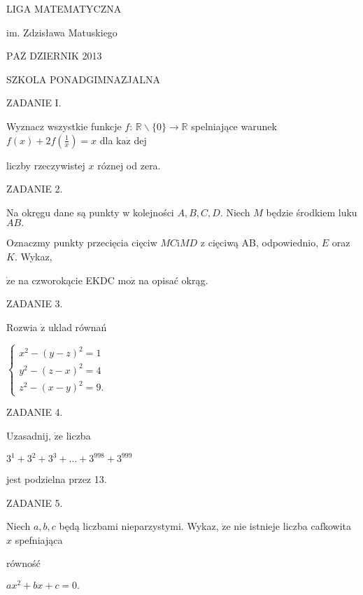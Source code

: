 \documentclass[a4paper,12pt]{article}
\begin{document}
LIGA MATEMATYCZNA

im. Zdzisława Matuskiego

$\mathrm{P}\mathrm{A}\overline{\mathrm{Z}}$ DZIERNIK 2013

SZKOLA PONADGIMNAZJALNA

ZADANIE I.

Wyznacz wszystkie funkcje $f$: $\mathbb{R}\backslash \{0\}\rightarrow \mathbb{R}$ spelniające warunek $f(x)+2f(\displaystyle \frac{1}{x})=x$ dla $\mathrm{k}\mathrm{a}\dot{\mathrm{z}}$ dej

liczby rzeczywistej $x$ róznej od zera.

ZADANIE 2.

Na okręgu dane są punkty w kolejności $A, B, C, D$. Niech $M$ będzie środkiem luku $AB.$

Oznaczmy punkty przecięcia cięciw $MC\mathrm{i}MD$ z cięciwą AB, odpowiednio, $E$ oraz $K$. Wykaz,

$\dot{\mathrm{z}}\mathrm{e}$ na czworokącie EKDC $\mathrm{m}\mathrm{o}\dot{\mathrm{z}}$ na opisać okrąg.

ZADANIE 3.

Rozwia $\dot{\mathrm{z}}$ uklad równań

$\left\{\begin{array}{l}
x^{2}-(y-z)^{2}=1\\
y^{2}-(z-x)^{2}=4\\
z^{2}-(x-y)^{2}=9.
\end{array}\right.$

ZADANIE 4.

Uzasadnij, $\dot{\mathrm{z}}\mathrm{e}$ liczba

$3^{1}+3^{2}+3^{3}+\ldots+3^{998}+3^{999}$

jest podzielna przez 13.

ZADANIE 5.

Niech $a, b, c$ będą liczbami nieparzystymi. Wykaz, $\dot{\mathrm{z}}\mathrm{e}$ nie istnieje liczba cafkowita $x$ spefniająca

równość

$ax^{2}+bx+c=0.$
\end{document}
